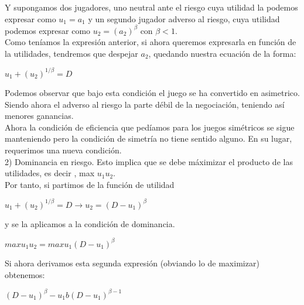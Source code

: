 \documentclass[10pt,a4paper]{book}
\begin{document}
Y supongamos dos jugadores, uno neutral ante el riesgo cuya utilidad la podemos expresar como $u_1=a_1$ y un segundo jugador adverso al riesgo, cuya utilidad podemos expresar como $u_2=(a_2)^\beta$ con $\beta < 1$.\\

Como teníamos la expresión anterior, si ahora queremos expresarla en función de la utilidades, tendremos que despejar $a_2$, quedando nuestra ecuación de la forma:\\

\begin{center}

$u_1 + (u_2)^{1/\beta}=D$

\end{center}

Podemos observar que bajo esta condición el juego se ha convertido en asimetrico. Siendo ahora el adverso al riesgo la parte débil de la negociación, teniendo así menores ganancias.\\

Ahora la condición de eficiencia que pedíamos para los juegos simétricos se sigue manteniendo pero la condición de simetría no tiene sentido alguno. En su lugar, requerimos una nueva condición. \\

	2) Dominancia en riesgo. Esto implica que se debe máximizar el producto de las utilidades, es decir , max $u_1 u_2$.\\

Por tanto, si partimos de la función de utilidad \\

\begin{center}

$u_1 + (u_2)^{1/\beta}=D \rightarrow u_2=(D-u_1)^\beta$ 

\end{center}

y se la aplicamos a la condición de dominancia.\\

\begin{center}

$max u_1 u_2 = max u_1(D-u_1)^\beta$

\end{center}

Si ahora derivamos esta segunda expresión (obviando lo de maximizar) obtenemos:\\

\begin{center}

$(D-u_1)^\beta - u_1b(D-u_1)^{\beta-1} $

\end{center}
\end{document}
